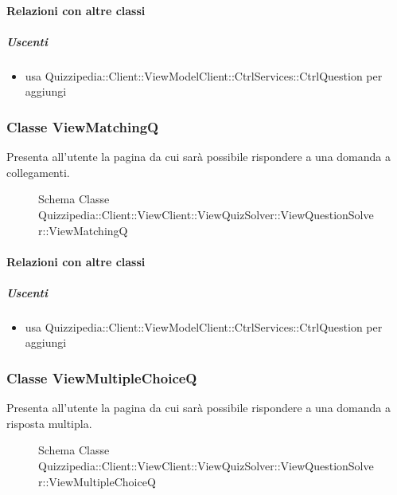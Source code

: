 \paragraph{Relazioni con altre classi}
\subparagraph{Uscenti}
\begin{itemize}
\item usa Quizzipedia::Client::ViewModelClient::CtrlServices::CtrlQuestion per aggiungi
\end{itemize}
\subsubsection{Classe ViewMatchingQ}
Presenta all'utente la pagina da cui sarà possibile rispondere a una domanda a collegamenti.
\begin{figure}[H]
\centering
\noindent{}
\caption[Schema Classe ViewMatchingQ]{Schema Classe Quizzipedia::Client::ViewClient::ViewQuizSolver::ViewQuestionSolver::ViewMatchingQ}
\end{figure}
\paragraph{Relazioni con altre classi}
\subparagraph{Uscenti}
\begin{itemize}
\item usa Quizzipedia::Client::ViewModelClient::CtrlServices::CtrlQuestion per aggiungi
\end{itemize}
\subsubsection{Classe ViewMultipleChoiceQ}
Presenta all'utente la pagina da cui sarà possibile rispondere a una domanda a risposta multipla.
\begin{figure}[H]
\centering
\noindent{}
\caption[Schema Classe ViewMultipleChoiceQ]{Schema Classe Quizzipedia::Client::ViewClient::ViewQuizSolver::ViewQuestionSolver::ViewMultipleChoiceQ}
\end{figure}
